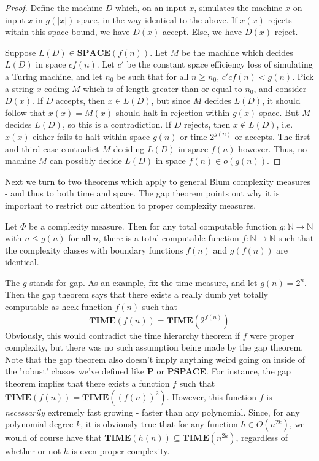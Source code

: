 \begin{proof}
 	Define the machine $D$ which, on an input $x$, simulates the machine $x$ on input $x$ in $g(|x|)$ space, in the way identical to the above. If $x(x)$ rejects within this space bound, we have $D(x)$ accept. Else, we have $D(x)$ reject. 
 	\par Suppose $L(D) \in \textbf{SPACE}(f(n))$. Let $M$ be the machine which decides $L(D)$ in space $cf(n)$. Let $c'$ be the constant space efficiency loss of simulating a Turing machine, and let $n_0$ be such that for all $n \geq n_0$, $c'cf(n) < g(n)$. Pick a string $x$ coding $M$ which is of length greater than or equal to $n_0$, and consider $D(x)$. If $D$ accepts, then $x \in L(D)$, but since $M$ decides $L(D)$, it should follow that $x(x) = M(x)$ should halt in rejection within $g(x)$ space. But $M$ decides $L(D)$, so this is a contradiction. If $D$ rejects, then $x \notin L(D)$, i.e. $x(x)$ either fails to halt within space $g(n)$ or time $2^{g(n)}$ or accepts. The first and third case contradict $M$ deciding $L(D)$ in space $f(n)$ however. Thus, no machine $M$ can possibly decide $L(D)$ in space $f(n) \in o(g(n))$.
\end{proof}
Next we turn to two theorems which apply to general Blum complexity measures - and thus to both time and space. The gap theorem points out why it is important to restrict our attention to proper complexity measures.
\begin{theorem}
	Let $\Phi$ be a complexity measure. Then for any total computable function $g:\mathbb{N} \to \mathbb{N}$ with $n \leq g(n)$ for all $n$, there is a total computable function $f:\mathbb{N} \to \mathbb{N}$ such that the complexity classes with boundary functions $f(n)$ and $g(f(n))$ are identical.
\end{theorem}
The $g$ stands for gap. As an example, fix the time measure, and let $g(n) = 2^n$. Then the gap theorem says that there exists a really dumb yet totally computable as heck function $f(n)$ such that 
\[ \textbf{TIME}(f(n)) = \textbf{TIME}(2^{f(n)}) \]
Obviously, this would contradict the time hierarchy theorem if $f$ were proper complexity, but there was no such assumption being made by the gap theorem. Note that the gap theorem also doesn't imply anything weird going on inside of the 'robust' classes we've defined like \textbf{P} or \textbf{PSPACE}. For instance, the gap theorem implies that there exists a function $f$ such that $\textbf{TIME}(f(n)) = \textbf{TIME}((f(n))^2)$. However, this function $f$ is \textit{necessarily} extremely fast growing - faster than any polynomial. Since, for any polynomial degree $k$, it is obviously true that for any function $h \in O(n^{2k})$, we would of course have that $\textbf{TIME}(h(n)) \subseteq \textbf{TIME}(n^{2k})$, regardless of whether or not $h$ is even proper complexity.
